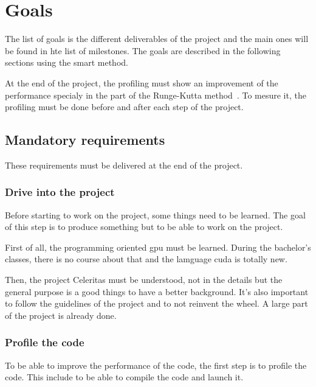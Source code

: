 \chapter{Goals}
\label{spec:ch:goals}

The list of goals is the different deliverables of the project and the main ones will be found in hte list of milestones.
The goals are described in the following sections using the \acrshort{smart} method.

At the end of the project, the profiling must show an improvement of the performance specialy in the part of the Runge-Kutta method~\cite{Runge-Kutta-methods}.
To mesure it, the profiling must be done before and after each step of the project.


\section{Mandatory requirements}
\label{spec:ch:goals:mandatory-requirements}

These requirements must be delivered at the end of the project.


\subsection{Drive into the project}
\label{spec:ch:goals:mandatory-requirements:drive-into-the-project}

Before starting to work on the project, some things need to be learned.
The goal of this step is to produce something but to be able to work on the project.

First of all, the programming oriented \acrshort{gpu} must be learned.
During the bachelor's classes, there is no course about that and the lamguage \acrshort{cuda} is totally new.

Then, the project Celeritas must be understood, not in the details but the general purpose is a good things to have a better background.
It's also important to follow the guidelines of the project and to not reinvent the wheel.
A large part of the project is already done.


\subsection{Profile the code}
\label{spec:ch:goals:mandatory-requirements:profile-the-code}

To be able to improve the performance of the code, the first step is to profile the code.
This include to be able to compile the code and launch it.

